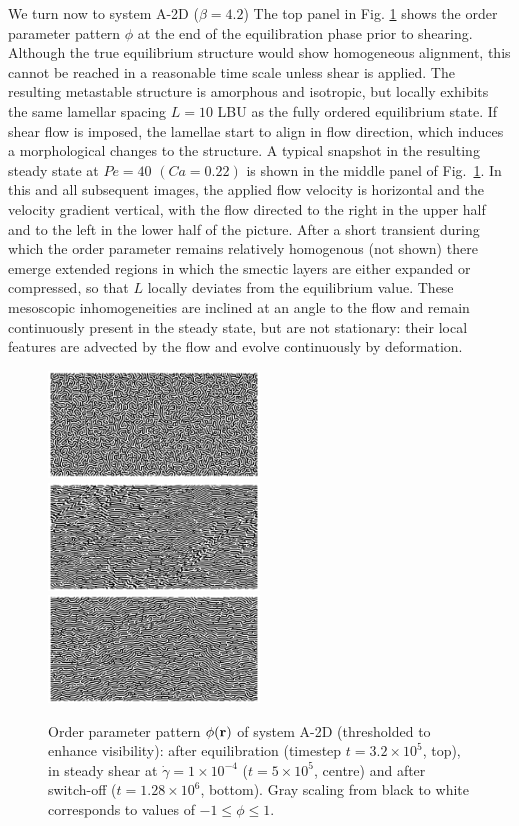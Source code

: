 \documentclass[8.5pt,twoside,twocolumn]{article}
\newcommand{\e}[1]{\times10^{#1}}
\begin{document}
We turn now to system A-2D ($\beta = 4.2$) The top panel in Fig. \ref{fig1} shows the order parameter pattern $\phi$ at the end of the equilibration phase prior to shearing.
Although the true equilibrium structure would show homogeneous alignment, this cannot be reached in a reasonable time scale unless shear is applied. The resulting metastable structure is amorphous and isotropic, but locally exhibits the same lamellar spacing $L = 10$ LBU as the fully ordered equilibrium state.
If shear flow is imposed, the lamellae start to align in flow direction, which induces a morphological changes to the structure. A typical snapshot in the resulting steady state at $Pe = 40$ $(Ca = 0.22)$ is shown in the middle panel of Fig.~\ref{fig1}. In this and all subsequent images, the applied flow velocity is horizontal and the velocity gradient vertical, with the flow directed to the right in the upper half and to the left in the lower half of the picture. After a short transient during which the order parameter remains relatively homogenous (not shown) there emerge extended regions in which the smectic layers are either expanded or compressed, so that $L$ locally deviates from the equilibrium value. These mesoscopic inhomogeneities are inclined at an angle to the flow and remain continuously present in the steady state, but are not stationary: their local features are advected by the flow and evolve continuously by deformation. 
\begin{figure}[htp]
\centering
\includegraphics[angle=0,width=0.5\textwidth]{phi_run703_320.jpg}\\
\includegraphics[angle=0,width=0.5\textwidth]{phi_run704_500.jpg}\\
\includegraphics[angle=0,width=0.5\textwidth]{phi_run705_1280.jpg}
\caption{Order parameter pattern $\phi({\bf r})$ of system A-2D (thresholded to enhance visibility): after equilibration (timestep $t=3.2\e{5}$, top), in steady shear at $\dot{\gamma}=1\times10^{-4}$ ($t=5\e{5}$, centre) and after switch-off ($t=1.28\e{6}$, bottom). Gray scaling from black to white corresponds to values of $-1\le\phi\le1$.}
\label{fig1}
\end{figure}
\end{document}
